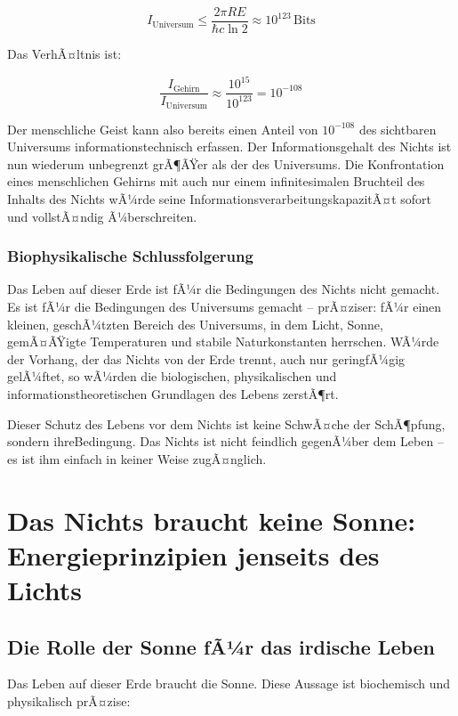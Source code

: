 ﻿\documentclass[12pt,a4paper]{report}
\begin{document}
\begin{equation}
	I_{\text{Universum}} \leq \frac{2\pi R E}{\hbar c \ln 2} \approx 10^{123}\,\text{Bits}
	\label{eq:universum_info}
\end{equation}

Das VerhÃ¤ltnis ist:

\begin{equation}
	\frac{I_{\text{Gehirn}}}{I_{\text{Universum}}} \approx \frac{10^{15}}{10^{123}} = 10^{-108}
\end{equation}

Der menschliche Geist kann also bereits einen Anteil von $10^{-108}$ des sichtbaren Universums informationstechnisch erfassen. Der Informationsgehalt des Nichts ist nun wiederum unbegrenzt grÃ¶ÃŸer als der des Universums. Die Konfrontation eines menschlichen Gehirns mit auch nur einem infinitesimalen Bruchteil des Inhalts des Nichts wÃ¼rde seine InformationsverarbeitungskapazitÃ¤t sofort und vollstÃ¤ndig Ã¼berschreiten.

\subsubsection{Biophysikalische Schlussfolgerung}

Das Leben auf dieser Erde ist fÃ¼r die Bedingungen des Nichts nicht gemacht. Es ist fÃ¼r die Bedingungen des Universums gemacht -- prÃ¤ziser: fÃ¼r einen kleinen, geschÃ¼tzten Bereich des Universums, in dem Licht, Sonne, gemÃ¤ÃŸigte Temperaturen und stabile Naturkonstanten herrschen. WÃ¼rde der Vorhang, der das Nichts von der Erde trennt, auch nur geringfÃ¼gig gelÃ¼ftet, so wÃ¼rden die biologischen, physikalischen und informationstheoretischen Grundlagen des Lebens zerstÃ¶rt.

Dieser Schutz des Lebens vor dem Nichts ist keine SchwÃ¤che der SchÃ¶pfung, sondern ihreBedingung. Das Nichts ist nicht feindlich gegenÃ¼ber dem Leben -- es ist ihm einfach in keiner Weise zugÃ¤nglich.

\section{Das Nichts braucht keine Sonne: Energieprinzipien jenseits des Lichts}

\subsection{Die Rolle der Sonne fÃ¼r das irdische Leben}

Das Leben auf dieser Erde braucht die Sonne. Diese Aussage ist biochemisch und physikalisch prÃ¤zise:
\end{document}
